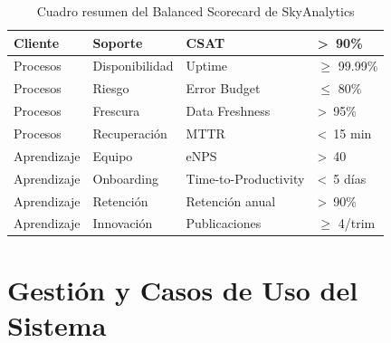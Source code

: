 ﻿\documentclass[11pt, letterpaper]{article}
\begin{document}
\begin{table}[H]
\begin{tabularx}{\linewidth}{>{\raggedright\arraybackslash}p{2.5cm} >{\raggedright\arraybackslash}p{3.5cm} >{\raggedright\arraybackslash}p{3cm} >{\raggedright\arraybackslash}X}
Cliente & Soporte & CSAT & \textgreater\ 90\% \\

\midrule

Procesos & Disponibilidad & Uptime & $\geq$ 99.99\% \\

\midrule

Procesos & Riesgo & Error Budget & $\leq$ 80\% \\

\midrule

Procesos & Frescura & Data Freshness & \textgreater\ 95\% \\

\midrule

Procesos & Recuperación & MTTR & \textless\ 15 min \\

\midrule

Aprendizaje & Equipo & eNPS & \textgreater\ 40 \\

\midrule

Aprendizaje & Onboarding & Time-to-Productivity & \textless\ 5 días \\

\midrule

Aprendizaje & Retención & Retención anual & \textgreater\ 90\% \\

\midrule

Aprendizaje & Innovación & Publicaciones & $\geq$ 4/trim \\

\bottomrule

\end{tabularx}

\caption{Cuadro resumen del Balanced Scorecard de SkyAnalytics}

\end{table}








\section{Gestión y Casos de Uso del Sistema}
\end{document}
